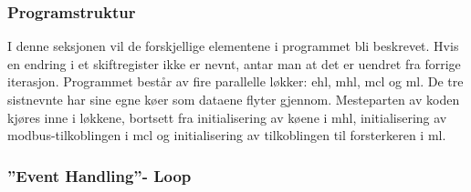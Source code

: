 \documentclass{ol-softwaremanual}
\begin{document}
\subsubsection{Programstruktur}
 I denne seksjonen vil de forskjellige elementene i programmet bli beskrevet. Hvis en endring i et skiftregister ikke er nevnt, antar man at det er uendret fra forrige iterasjon. Programmet består av fire parallelle løkker: \acrlong{ehl}, \acrlong{mhl}, \acrlong{mcl} og \acrlong{ml}. De tre sistnevnte har sine egne køer som dataene flyter gjennom. Mesteparten av koden kjøres inne i løkkene, bortsett fra initialisering av køene i \acrshort{mhl}, initialisering av \gls{modbus}-tilkoblingen i \acrshort{mcl} og initialisering av tilkoblingen til forsterkeren i \acrshort{ml}.
\subsubsection*{''Event Handling''- Loop}
\end{document}
